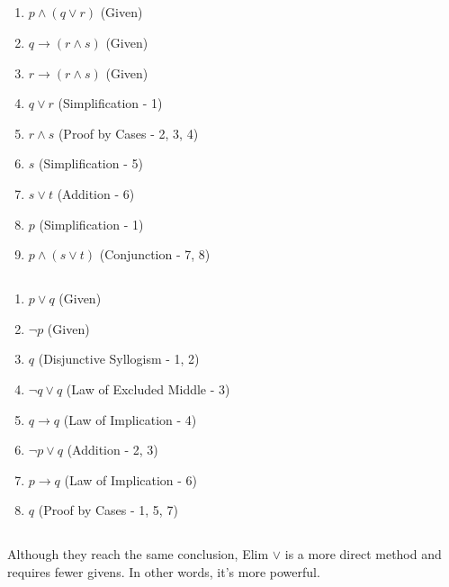 \documentclass[11pt]{article}
\makeatletter
\def\imp{\rightarrow}
\renewenvironment{proof}[1][\proofname]{\par
  \normalfont \topsep6\p@\@plus6\p@\relax
  \trivlist
  \item[\hskip\labelsep
        \itshape
    #1\@addpunct{.}]\ignorespaces
}{%
  \endtrivlist\@endpefalse
}
\makeatother
\begin{document}
\subsection{} %
\begin{proof}[\textbf{Prove $p \land (s \lor t)$}] \leavevmode
 	\begin{enumerate}
		\item $p \land (q \lor r)$ \hfill (Given)
		\item $q \imp (r \land s)$ \hfill (Given)
		\item $r \imp (r \land s)$ \hfill (Given)
		\item $q \lor r$ \hfill (Simplification - 1)
		\item $r \land s$ \hfill (Proof by Cases - 2, 3, 4)
		\item $s$ \hfill (Simplification - 5) 
		\item $s \lor t$ \hfill (Addition - 6)
		\item $p$ \hfill (Simplification - 1)
		\item $p \land (s \lor t)$ \hfill (Conjunction - 7, 8)
	\end{enumerate}
\end{proof}

\subsection{} %
\begin{proof}[\textbf{Prove $q$}] \leavevmode
 	\begin{enumerate}
		\item $p \lor q$ \hfill (Given)
		\item $\neg p$ \hfill (Given)
		\item $q$ \hfill (Disjunctive Syllogism - 1, 2)
		\item $\neg q \lor q$ \hfill (Law of Excluded Middle - 3)
		\item $q \imp q$ \hfill (Law of Implication - 4)
		\item $\neg p \lor q$ \hfill (Addition - 2, 3)
		\item $p \imp q$ \hfill (Law of Implication - 6)
		\item $q$ \hfill (Proof by Cases - 1, 5, 7)
	\end{enumerate}
\end{proof}

\subsection{} %
Although they reach the same conclusion, Elim $\lor$ is a more direct method and requires fewer givens. In other words, it's more powerful. 
\end{document}
